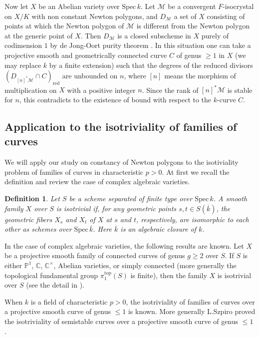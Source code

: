 \documentclass[11pt]{amsart}
\newtheorem{definition}[Lemma]{Definition}
\begin{document}
Now let $X$ be an Abelian variety over $\mathrm{Spec}\, k$. 
Let $\mathcal M$ be a convergent $F$-isocrystal on $X/K$ with non constant Newton polygons, 
and $D_{\mathcal M}$ a set of $X$ consisting of points at which 
the Newton polygon of $\mathcal M$ is different from the Newton polygon at the generic point of $X$. 
Then $D_{\mathcal M}$ is a closed subscheme in $X$ purely of codimension $1$ 
by de Jong-Oort purity theorem \cite[Theorem 4.1]{DO}. 
In this situation one can take a projective smooth and geometrically connected curve $C$ of genus $\geq 1$ in $X$ 
(we may replace $k$ by a finite extension) such that 
the degrees of the reduced divisors $(D_{[n]^\ast\mathcal M} \cap C)_{\mathrm{red}}$ 
are unbounded on $n$, where $[n]$ means the morphism of multiplication on $X$ with a positive integer $n$. 
Since the rank of $[n]^\ast\mathcal M$ is stable for $n$, 
this contradicts to the existence of bound with respect to the $k$-curve $C$.  

\subsection{Application to the isotriviality of families of curves}\label{isotsec}
We will apply our study on constancy of Newton polygons to the isotiviality problem of families of curves in characteristic $p>0$. 
At first we recall the definition and review the case of complex algebraic varieties. 

\begin{definition}\label{Isot} Let $S$ be a scheme separated of finite type over $\mathrm{Spec}\, k$. 
A smooth family $X$ over $S$ is isotrivial if, for any geometric points $s, t \in S(\overline{k})$, 
the geometric fibers $X_s$ and $X_t$ of $X$ at $s$ and $t$, 
respectively, are isomorphic to each other as schemes over $\mathrm{Spec}\, \overline{k}$. 
Here $\overline{k}$ is an algebraic closure of $k$. 
\end{definition}

In the case of complex algebraic varieties, the following results are known. 
Let $X$ be a projective smooth family of connected curves of genus $g \geq 2$ over $S$. 
If $S$ is either $\mathbb P^1$, $\mathbb C$, $\mathbb C^\times$, Abelian varieties, 
or simply connected (more generally the topological fundamental group 
$\pi_1^{\mathrm{top}}(S)$ is finite), then the family $X$ is isotrivial 
over $S$ (see the detail in \cite{DM}).

When $k$ is a field of characteristic $p>0$, 
the isotriviality of families of curves over a projective smooth curve of genus $\leq 1$ 
is known. More generally L.Szpiro proved the isotriviality of 
semistable curves over a projective smooth curve of genus $\leq 1$ \cite[Th\'eor\`eme 4]{szpiro}. 
\end{document}
